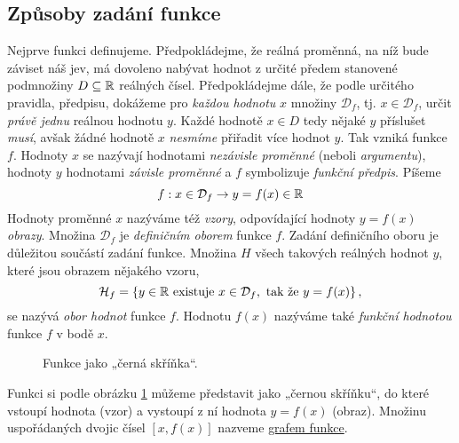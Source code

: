 {      \subsection{Způsoby zadání funkce}\label{MAI:section_000}
        Nejprve funkci definujeme. Předpokládejme, že reálná proměnná, na níž bude záviset náš jev, 
        má dovoleno nabývat hodnot z určité předem stanovené podmnožiny \(D\subseteq\mathbb{R}\) 
        reálných čísel. Předpokládejme dále, že podle určitého pravidla, předpisu, dokážeme pro 
        \emph{každou hodnotu} \(x\) množiny \(\mathcal{D}_f\), tj. \(x \in \mathcal{D}_f\), určit 
        \emph{právě jednu} reálnou hodnotu \(y\). Každé hodnotě \(x \in D\) tedy nějaké \(y\) 
        příslušet \emph{musí},  avšak žádné hodnotě \(x\) \emph{nesmíme} přiřadit více hodnot 
        \(y\). Tak vzniká funkce \(f\). Hodnoty \(x\) se nazývají hodnotami \emph{nezávisle 
        proměnné} (neboli \emph{argumentu}), hodnoty \(y\) hodnotami \emph{závisle proměnné} a 
        \(f\) symbolizuje \emph{funkční předpis}. Píšeme
        \begin{equation}\label{mai:eq000}
            f: x \in \mathcal{D}_f \rightarrow y=f(x)\in\mathbb{R}
        \end{equation}
      Hodnoty proměnné \(x\) nazýváme též \emph{vzory}, odpovídající hodnoty \(y = f(x)\) 
      \emph{obrazy}. Množina  \(\mathcal{D}_f\) je \emph{definičním oborem} funkce \(f\). Zadání 
      definičního oboru je důležitou součástí zadání funkce. Množina \(H\) všech takových reálných 
      hodnot \(y\), které jsou obrazem nějakého vzoru, 
      \begin{equation}\label{mai:eq001}
          \mathcal{H}_f = 
              \left\lbrace 
                y\in\mathbb{R}\text{ existuje } x\in \mathcal{D}_f, \text{ tak že } y = f(x)  
              \right\rbrace, 
      \end{equation}
      se nazývá \emph{obor hodnot} funkce \(f\). Hodnotu \(f(x)\) nazýváme také \emph{funkční 
      hodnotou} funkce \(f\) v bodě \(x\). 

      \begin{figure}[ht!] %
        \centering
        
        \caption{Funkce jako „černá skříňka“. \cite[s.~54]{Musilova2009MA1}}
        \label{mai_fig001}
      \end{figure}
      
      Funkci si podle obrázku \ref{mai_fig001} můžeme představit jako „černou skříňku“, do které 
      vstoupí hodnota (vzor) a vystoupí z ní hodnota \(y = f(x)\) (obraz). Množinu uspořádaných 
      dvojic čísel \([x, f(x)]\) nazveme \hyperref[MAI:section_001]{grafem funkce}.
      
}
